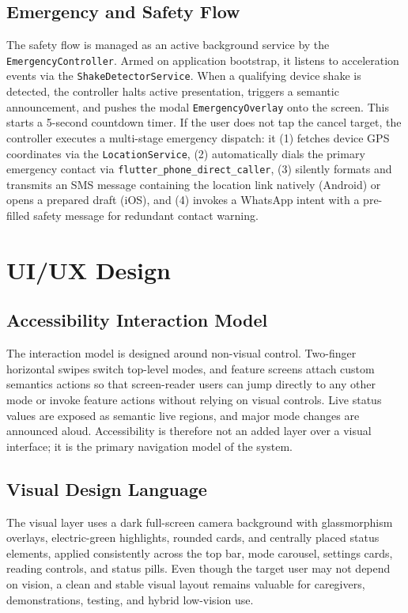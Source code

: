 \documentclass[a4paper]{report}
\begin{document}
\subsection{Emergency and Safety Flow}
The safety flow is managed as an active background service by the \texttt{EmergencyController}. Armed on application bootstrap, it listens to acceleration events via the \texttt{ShakeDetectorService}. When a qualifying device shake is detected, the controller halts active presentation, triggers a semantic announcement, and pushes the modal \texttt{EmergencyOverlay} onto the screen. This starts a 5-second countdown timer. If the user does not tap the cancel target, the controller executes a multi-stage emergency dispatch: it (1) fetches device GPS coordinates via the \texttt{LocationService}, (2) automatically dials the primary emergency contact via \texttt{flutter\_phone\_direct\_caller}, (3) silently formats and transmits an SMS message containing the location link natively (Android) or opens a prepared draft (iOS), and (4) invokes a WhatsApp intent with a pre-filled safety message for redundant contact warning.

\section{UI/UX Design}
\subsection{Accessibility Interaction Model}
The interaction model is designed around non-visual control. Two-finger horizontal swipes switch top-level modes, and feature screens attach custom semantics actions so that screen-reader users can jump directly to any other mode or invoke feature actions without relying on visual controls. Live status values are exposed as semantic live regions, and major mode changes are announced aloud. Accessibility is therefore not an added layer over a visual interface; it is the primary navigation model of the system.

\subsection{Visual Design Language}
The visual layer uses a dark full-screen camera background with glassmorphism overlays, electric-green highlights, rounded cards, and centrally placed status elements, applied consistently across the top bar, mode carousel, settings cards, reading controls, and status pills. Even though the target user may not depend on vision, a clean and stable visual layout remains valuable for caregivers, demonstrations, testing, and hybrid low-vision use.
\end{document}
